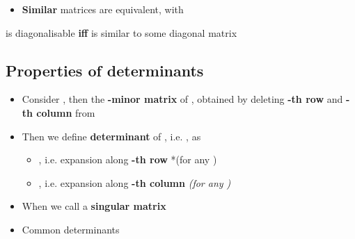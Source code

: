 \begin{itemize}

      \item
            \textbf{Similar} matrices are equivalent, with
\end{itemize}

 is diagonalisable \textbf{iff}  is similar to some
diagonal matrix 


\subsection*{Properties of determinants}

\begin{itemize}

      \item
            Consider , then
             the
            \textbf{-minor matrix} of , obtained by deleting
            \textbf{-th row} and \textbf{-th column} from
      \item
            Then we define \textbf{determinant} of ,
            i.e. , as

            \begin{itemize}

                  \item
                        ,
                        i.e. expansion along \textbf{-th row} *(for any )
                  \item
                        ,
                        i.e. expansion along \textbf{-th column} \emph{(for any
                              )}
            \end{itemize}
      \item
            When  we call  a \textbf{singular matrix}
      \item
            Common determinants

            \begin{itemize}


\end{itemize}
\end{itemize}
